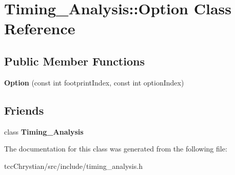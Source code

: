 \hypertarget{classTiming__Analysis_1_1Option}{\section{Timing\-\_\-\-Analysis\-:\-:Option Class Reference}
\label{classTiming__Analysis_1_1Option}
}
\subsection*{Public Member Functions}
\begin{DoxyCompactItemize}
\item 
\hypertarget{classTiming__Analysis_1_1Option_a1d95559d49ea714e293a8679cefe8295}{{\bfseries Option} (const int footprint\-Index, const int option\-Index)}\label{classTiming__Analysis_1_1Option_a1d95559d49ea714e293a8679cefe8295}

\end{DoxyCompactItemize}
\subsection*{Friends}
\begin{DoxyCompactItemize}
\item 
\hypertarget{classTiming__Analysis_1_1Option_aab560f9cdcd55852a6a08a29a54a2b16}{class {\bfseries Timing\-\_\-\-Analysis}}\label{classTiming__Analysis_1_1Option_aab560f9cdcd55852a6a08a29a54a2b16}

\end{DoxyCompactItemize}


The documentation for this class was generated from the following file\-:\begin{DoxyCompactItemize}
\item 
tcc\-Chrystian/src/include/timing\-\_\-analysis.\-h\end{DoxyCompactItemize}
